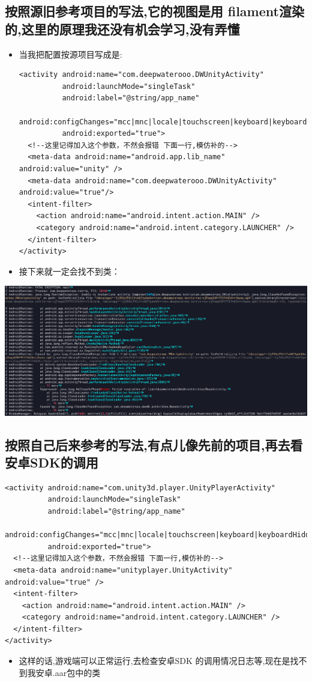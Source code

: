 \documentclass[9pt, b5paper]{article}
\begin{document}
\subsection{按照源旧参考项目的写法,它的视图是用 filament渲染的,这里的原理我还没有机会学习,没有弄懂}
\label{sec-8-1}
\begin{itemize}
\item 当我把配置按源项目写成是:
\begin{verbatim}
<activity android:name="com.deepwaterooo.DWUnityActivity"
          android:launchMode="singleTask"
          android:label="@string/app_name"
          android:configChanges="mcc|mnc|locale|touchscreen|keyboard|keyboardHidden|navigation|orientation|screenLayout|uiMode|screenSize|smallestScreenSize|fontScale"
          android:exported="true">
  <!--这里记得加入这个参数，不然会报错 下面一行,模仿补的-->
  <meta-data android:name="android.app.lib_name" android:value="unity" />
  <meta-data android:name="com.deepwaterooo.DWUnityActivity" android:value="true"/>
  <intent-filter>
    <action android:name="android.intent.action.MAIN" />
    <category android:name="android.intent.category.LAUNCHER" />
  </intent-filter>
</activity>
\end{verbatim}
\item 接下来就一定会找不到类：
\end{itemize}

\includegraphics[width=.9\linewidth]{./pic/readme_20221218_220636.png}
\subsection{按照自己后来参考的写法,有点儿像先前的项目,再去看安卓SDK的调用}
\label{sec-8-2}
\begin{verbatim}
<activity android:name="com.unity3d.player.UnityPlayerActivity"
          android:launchMode="singleTask"
          android:label="@string/app_name"
          android:configChanges="mcc|mnc|locale|touchscreen|keyboard|keyboardHidden|navigation|orientation|screenLayout|uiMode|screenSize|smallestScreenSize|fontScale"
          android:exported="true">
  <!--这里记得加入这个参数，不然会报错 下面一行,模仿补的-->
  <meta-data android:name="unityplayer.UnityActivity" android:value="true" />
  <intent-filter>
    <action android:name="android.intent.action.MAIN" />
    <category android:name="android.intent.category.LAUNCHER" />
  </intent-filter>
</activity>
\end{verbatim}
\begin{itemize}
\item 这样的话,游戏端可以正常运行,去检查安卓SDK 的调用情况日志等,现在是找不到我安卓.aar包中的类
\end{itemize}
\end{document}
